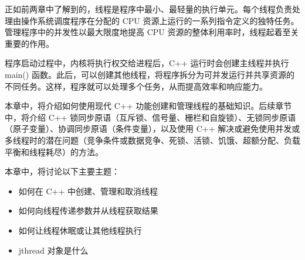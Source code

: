 正如前两章中了解到的，线程是程序中最小、最轻量的执行单元。每个线程负责处理由操作系统调度程序在分配的 CPU 资源上运行的一系列指令定义的独特任务。管理程序中的并发性以最大限度地提高 CPU 资源的整体利用率时，线程起着至关重要的作用。

程序启动过程中，内核将执行权交给进程后，C++ 运行时会创建主线程并执行 main() 函数。此后，可以创建其他线程，将程序拆分为可并发运行并共享资源的不同任务。这样，程序就可以处理多个任务，从而提高效率和响应能力。

本章中，将介绍如何使用现代 C++ 功能创建和管理线程的基础知识。后续章节中，将介绍 C++ 锁同步原语（互斥锁、信号量、栅栏和自旋锁）、无锁同步原语（原子变量）、协调同步原语（条件变量），以及使用 C++ 解决或避免使用并发或多线程时的潜在问题（竞争条件或数据竞争、死锁、活锁、饥饿、超额分配、负载平衡和线程耗尽）的方法。

本章中，将讨论以下主要主题：

\begin{itemize}
\item
如何在 C++ 中创建、管理和取消线程

\item
如何向线程传递参数并从线程获取结果

\item
如何让线程休眠或让其他线程执行

\item
jthread 对象是什么
\end{itemize}





